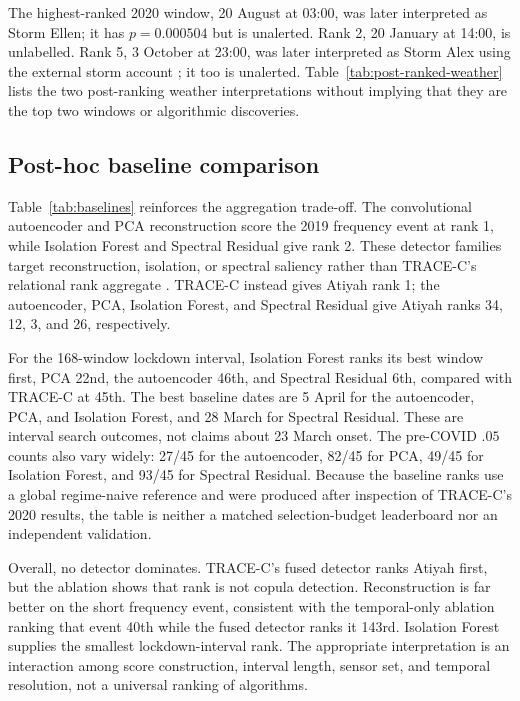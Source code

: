 The highest-ranked 2020 window, 20 August at 03:00, was later interpreted as
Storm Ellen; it has $p=0.000504$ but is unalerted. Rank 2, 20 January at 14:00,
is unlabelled. Rank 5, 3 October at 23:00, was later interpreted as Storm Alex
using the external storm account \citep{metoffice2020stormalex}; it too is
unalerted. Table~\ref{tab:post-ranked-weather} lists the two post-ranking weather
interpretations without implying that they are the top two windows or
algorithmic discoveries.

\subsection{Post-hoc baseline comparison}



Table~\ref{tab:baselines} reinforces the aggregation trade-off. The
convolutional autoencoder and PCA reconstruction score the 2019 frequency event
at rank 1, while Isolation Forest and Spectral Residual give rank 2. These
detector families target reconstruction, isolation, or spectral saliency
rather than TRACE-C's relational rank aggregate
\citep{sakurada2014autoencoders,jackson1979pcaresiduals,liu2008isolationforest,ren2019spectralresidual}.
TRACE-C instead gives Atiyah rank 1; the autoencoder, PCA, Isolation Forest, and
Spectral Residual give Atiyah ranks 34, 12, 3, and 26, respectively.

For the 168-window lockdown interval, Isolation Forest ranks its best window
first, PCA 22nd, the autoencoder 46th, and Spectral Residual 6th, compared with
TRACE-C at 45th. The best baseline dates are 5 April for the autoencoder, PCA,
and Isolation Forest, and 28 March for Spectral Residual. These are interval
search outcomes, not claims about 23 March onset. The pre-COVID $.05$ counts
also vary widely: 27/45 for the autoencoder, 82/45 for PCA, 49/45 for Isolation
Forest, and 93/45 for Spectral Residual. Because the baseline ranks use a global
regime-naive reference and were produced after inspection of TRACE-C's 2020
results, the table is neither a matched selection-budget leaderboard nor an
independent validation.

Overall, no detector dominates. TRACE-C's fused detector ranks Atiyah first,
but the ablation shows that rank is not copula detection. Reconstruction is
far better on the short frequency event, consistent with the temporal-only
ablation ranking that event 40th while the fused detector ranks it 143rd.
Isolation Forest supplies the smallest lockdown-interval rank. The appropriate
interpretation is an interaction among score construction, interval length,
sensor set, and temporal resolution, not a universal ranking of algorithms.

